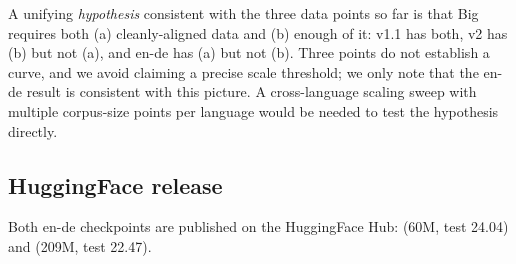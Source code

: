 A unifying \emph{hypothesis} consistent with the three data points so far is that Big requires both (a) cleanly-aligned data and (b) enough of it: v1.1 has both, v2 has (b) but not (a), and en-de has (a) but not (b). Three points do not establish a curve, and we avoid claiming a precise scale threshold; we only note that the en-de result is consistent with this picture. A cross-language scaling sweep with multiple corpus-size points per language would be needed to test the hypothesis directly.

\subsection{HuggingFace release}
Both en-de checkpoints are published on the HuggingFace Hub:
 (60M, test 24.04) and
 (209M, test 22.47).

